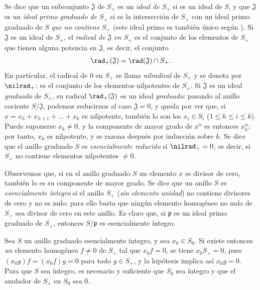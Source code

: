 \documentclass[oneside,10pt]{amsart}
\renewcommand{\leq}{\leqslant}
\let\EGAOriginalLabel\label
\renewcommand{\label}[1]{\phantomsection\EGAOriginalLabel{#1}}
\begin{document}
\begin{env}[2.1.10]
\label{II.2.1.10}
Se dice que un subconjunto $\mathfrak{J}$ de $S_+$ es un \emph{ideal de $S_+$} si es un ideal de $S$, y que $\mathfrak{J}$ es un \emph{ideal primo graduado de $S_+$} si es la intersección de $S_+$ con un ideal primo graduado de $S$ \emph{que no contiene $S_+$} (este ideal primo es también único según ).
Si $\mathfrak{J}$ es un ideal de $S_+$, el \emph{radical de $\mathfrak{J}$ en $S_+$} es el conjunto de los elementos de $S_+$ que tienen alguna potencia en $\mathfrak{J}$, es decir, el conjunto
\[
  \rad_+(\mathfrak{J})=\rad(\mathfrak{J})\cap S_+.
\]
En particular, el radical de $0$ en $S_+$ se llama \emph{nilradical} de $S_+$ y se denota por $\nilrad_+$: es el conjunto de los elementos nilpotentes de $S_+$.
Si $\mathfrak{J}$ es un ideal \emph{graduado} de $S_+$, su radical $\rad_+(\mathfrak{J})$ es un ideal \emph{graduado}: pasando al anillo cociente $S/\mathfrak{J}$, podemos reducirnos al caso $\mathfrak{J}=0$, y queda por ver que, si $x=x_h+x_{h+1}+\ldots+x_k$ es nilpotente, también lo son los $x_i\in S_i$ ($1\leq h\leq i\leq k$).
Puede suponerse $x_k\neq0$, y la componente de mayor grado de $x^n$ es entonces $x_k^n$; por tanto, $x_k$ es nilpotente, y se razona después por inducción sobre $k$.
Se dice que el anillo graduado $S$ es \emph{esencialmente reducido} si $\nilrad_+=0$, es decir, si $S_+$ no contiene elementos nilpotentes $\neq0$.
\end{env}

\begin{env}[2.1.11]
\label{II.2.1.11}
Observemos que, si en el anillo graduado $S$ un elemento $x$ es divisor de cero, también lo es su componente de mayor grado.
Se dice que un anillo $S$ es \emph{esencialmente íntegro} si el anillo $S_+$ (\emph{sin elemento unidad}) no contiene divisores de cero y no es nulo; para ello basta que ningún elemento homogéneo no nulo de $S_+$ sea divisor de cero en este anillo.
Es claro que, si $\mathfrak{p}$ es un ideal primo graduado de $S_+$, entonces $S/\mathfrak{p}$ es esencialmente íntegro.

Sea $S$ un anillo graduado esencialmente íntegro, y sea $x_0\in S_0$.
Si existe entonces \emph{un} elemento homogéneo $f\neq0$ de $S_+$ tal que $x_0f=0$, se tiene $x_0S_+=0$, pues $(x_0g)f=(x_0f)g=0$ para todo $g\in S_+$, y la hipótesis implica así $x_0g=0$.
Para que $S$ sea íntegro, es necesario y suficiente que $S_0$ sea íntegro y que el anulador de $S_+$ en $S_0$ sea $0$.
\end{env}
\end{document}
